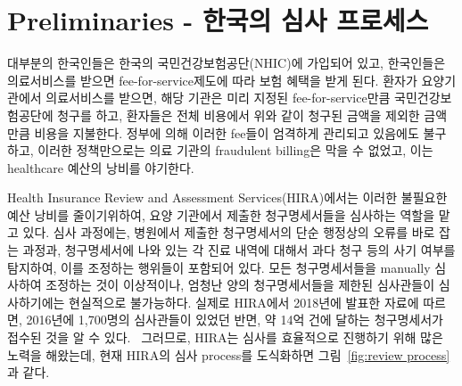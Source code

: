 \documentclass[11pt]{article}           %
\begin{document}




\section{Preliminaries - 한국의 심사 프로세스}
\label{2}

대부분의 한국인들은 한국의 국민건강보험공단(NHIC)에 가입되어 있고, 한국인들은 의료서비스를 받으면 fee-for-service제도에 따라 보험 혜택을 받게 된다.
환자가 요양기관에서 의료서비스를 받으면, 해당 기관은 미리 지정된 fee-for-service만큼 국민건강보험공단에 청구를 하고, 환자들은 전체 비용에서 위와 같이 청구된 금액을 제외한 금액만큼 비용을 지불한다.
정부에 의해 이러한 fee들이 엄격하게 관리되고 있음에도 불구하고, 이러한 정책만으로는 의료 기관의 fraudulent billing은 막을 수 없었고, 이는 healthcare 예산의 낭비를 야기한다.

Health Insurance Review and Assessment Services(HIRA)에서는 이러한 불필요한 예산 낭비를 줄이기위하여, 요양 기관에서 제출한 청구명세서들을 심사하는 역할을 맡고 있다.
심사 과정에는, 병원에서 제출한 청구명세서의 단순 행정상의 오류를 바로 잡는 과정과, 청구명세서에 나와 있는 각 진료 내역에 대해서 과다 청구 등의 사기 여부를 탐지하여, 이를 조정하는 행위들이 포함되어 있다.
모든 청구명세서들을 manually 심사하여 조정하는 것이 이상적이나, 엄청난 양의 청구명세서들을 제한된 심사관들이 심사하기에는 현실적으로 불가능하다.
실제로 HIRA에서 2018년에 발표한 자료에 따르면, 2016년에 1,700명의 심사관들이 있었던 반면, 약 14억 건에 달하는 청구명세서가 접수된 것을 알 수 있다.~\cite{hira2018}
그러므로, HIRA는 심사를 효율적으로 진행하기 위해 많은 노력을 해왔는데, 현재 HIRA의 심사 process를 도식화하면 그림~\ref{fig:review process}과 같다.
\end{document}
